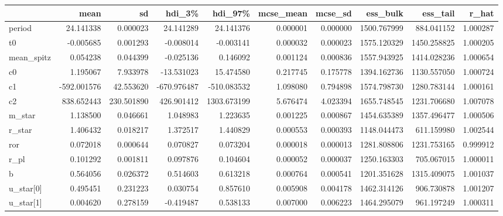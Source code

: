 \begin{tabular}{lrrrrrrrrr}
\toprule
{} &        mean &          sd &      hdi\_3\% &      hdi\_97\% &  mcse\_mean &   mcse\_sd &     ess\_bulk &     ess\_tail &     r\_hat \\
\midrule
period        &   24.141338 &    0.000023 &   24.141289 &    24.141376 &   0.000001 &  0.000000 &  1500.767999 &   884.041152 &  1.000287 \\
t0            &   -0.005685 &    0.001293 &   -0.008014 &    -0.003141 &   0.000032 &  0.000023 &  1575.120329 &  1450.258825 &  1.000205 \\
mean\_spitz    &    0.054238 &    0.044399 &   -0.025136 &     0.146092 &   0.001124 &  0.000836 &  1557.943925 &  1414.028236 &  1.000654 \\
c0            &    1.195067 &    7.933978 &  -13.531023 &    15.474580 &   0.217745 &  0.175778 &  1394.162736 &  1130.557050 &  1.000724 \\
c1            & -592.001576 &   42.553620 & -670.976487 &  -510.083532 &   1.098080 &  0.794898 &  1574.798730 &  1280.783144 &  1.000161 \\
c2            &  838.652443 &  230.501890 &  426.901412 &  1303.673199 &   5.676474 &  4.023394 &  1655.748545 &  1231.706680 &  1.007078 \\
m\_star        &    1.138500 &    0.046661 &    1.048983 &     1.223635 &   0.001225 &  0.000867 &  1454.635389 &  1357.496477 &  1.000506 \\
r\_star        &    1.406432 &    0.018217 &    1.372517 &     1.440829 &   0.000553 &  0.000393 &  1148.044473 &   611.159980 &  1.002544 \\
ror           &    0.072018 &    0.000644 &    0.070827 &     0.073204 &   0.000018 &  0.000013 &  1281.808806 &  1231.753165 &  0.999912 \\
r\_pl          &    0.101292 &    0.001811 &    0.097876 &     0.104604 &   0.000052 &  0.000037 &  1250.163303 &   705.067015 &  1.000011 \\
b             &    0.564056 &    0.026372 &    0.514603 &     0.613218 &   0.000764 &  0.000541 &  1201.351628 &  1315.409075 &  1.001037 \\
u\_star[0]     &    0.495451 &    0.231223 &    0.030754 &     0.857610 &   0.005908 &  0.004178 &  1462.314126 &   906.730878 &  1.001207 \\
u\_star[1]     &    0.004620 &    0.278159 &   -0.419487 &     0.538133 &   0.007000 &  0.006223 &  1464.295079 &   961.197249 &  1.000311 \\

\end{tabular}

